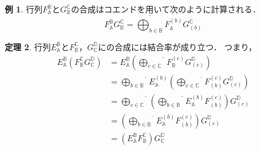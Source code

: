 \documentclass[a4j,12pt]{jarticle}
\theoremstyle{definition}
\newtheorem{theorem}{定理}[section]
\newtheorem{example}[theorem]{例}
\numberwithin{equation}{section}
\newcommand{\CC}{\mathbb{C}}
\renewcommand{\AA}{\mathbb{A}}
\newcommand{\BB}{\mathbb{B}}
\newcommand{\DD}{\mathbb{D}}
\newcommand{\1}{\mathbb{1}}
\newcommand{\2}{\mathbb{2}}
\renewcommand{\.}{\hspace{2mm}}
\newcommand{\CoEnd}[1]{\overline{\bigoplus_{#1}}}
\begin{document}
\begin{example}
  行列$F^\BB_\AA$と$G^\CC_\BB$の合成はコエンドを用いて次のように計算される．
  \[
    F^\BB_\AA G^\CC_\BB = \CoEnd{b \in \BB} F^{(b)}_\AA G^\CC_{(b)}
  \]
\end{example}
\begin{theorem}
  行列$E_\AA^\BB$と$F_\BB^\CC$，$G_\CC^\DD$にの合成には結合率が成り立つ．
  つまり，
  \begin{align*}
    E_\AA^\BB (F_\BB^\CC G_\CC^\DD) &= E_\AA^\BB \left(\CoEnd{c \in \CC} F_\BB^{(c)} G_{(c)}^\DD\right) \\
    &= \CoEnd{b \in \BB} E_\AA^{(b)} \left(\CoEnd{c \in \CC} F_{(b)}^{(c)} G_{(c)}^\DD\right) \\
    &= \CoEnd{c \in \CC} \left(\CoEnd{b \in \BB} E_\AA^{(b)} F_{(b)}^{(c)} \right) G_{(c)}^\DD \\
    &= \left(\CoEnd{b \in \BB} E_\AA^{(b)} F_{(b)}^{(c)}\right) G_{(c)}^\DD \\
    &= (E_\AA^\BB F_\BB^\CC) G_\CC^\DD
  \end{align*}
\end{theorem}
\end{document}
